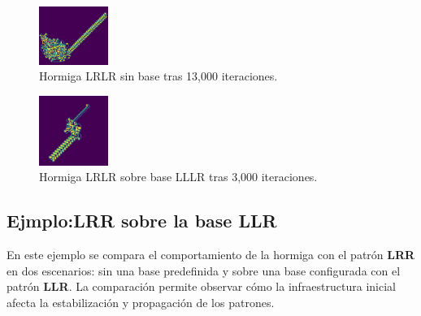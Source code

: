 \documentclass[11pt,letterpaper]{article}
\begin{document}
\begin{multicols}{2}
\begin{figure}[h!]
    \centering
    \includegraphics[width=0.2\textwidth]{reportTemplate/figures/lrlr_sin_base.png}
    \caption{Hormiga LRLR sin base tras 13,000 iteraciones.}
    \label{fig:lrlr_sin_base}
\end{figure}

\begin{figure}[h!]
    \centering
    \includegraphics[width=0.2\textwidth]{reportTemplate/figures/lrlr_13000.png}
    \caption{Hormiga LRLR sobre base LLLR tras 3,000 iteraciones.}
    \label{fig:lrlr_13000}
\end{figure}





\subsection{Ejmplo:LRR sobre la base LLR}

En este ejemplo se compara el comportamiento de la hormiga con el patrón \textbf{LRR} en dos escenarios: sin una base predefinida y sobre una base configurada con el patrón \textbf{LLR}. La comparación permite observar cómo la infraestructura inicial afecta la estabilización y propagación de los patrones.


\end{multicols}
\end{document}
